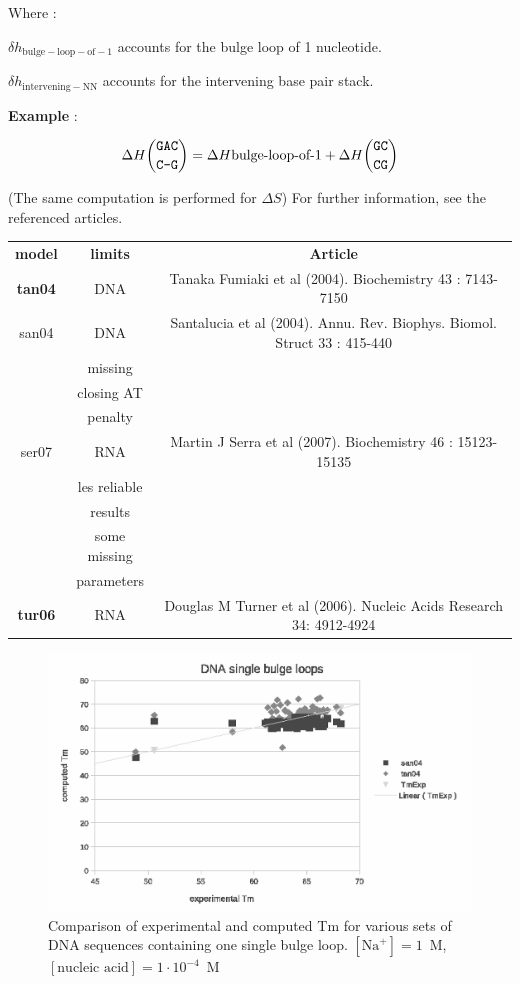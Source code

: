 \documentclass{article}
\begin{document}
Where :

$\delta{}h_\mathrm{bulge-loop-of-1}$ accounts for the bulge loop of 1 nucleotide.

$\delta{}h_\mathrm{intervening-NN}$ accounts for the intervening base pair stack.


\textbf{Example} :

\begin{multline*}
\Delta H {\mbox{\texttt{GAC}} \choose \mbox{\texttt{C-G}}} =
\Delta H {\mbox{bulge-loop-of-1}} +
\Delta H {\mbox{\texttt{GC}} \choose \mbox{\texttt{CG}}} \\
\end{multline*}

       (The same computation is performed for $\Delta S$) 
For further information, see the referenced articles.

\begin{table}[h]
\begin{tabular}[h]{| c | c | c |}
\textbf{model} & \textbf{limits} & \textbf{Article} \\
\textbf{tan04} & DNA & Tanaka Fumiaki et al (2004). Biochemistry 43 : 7143-7150 \\
san04 & DNA & Santalucia et al (2004). Annu. Rev. Biophys. Biomol. Struct 33 : 415-440\\
 & missing & \\
 & closing AT & \\
 & penalty & \\
ser07 & RNA & Martin J Serra et al (2007). Biochemistry 46 : 15123-15135 \\
 & les reliable & \\
 & results & \\
 & some missing & \\
 & parameters & \\
\textbf{tur06} & RNA & Douglas M Turner et al (2006). Nucleic Acids Research 34: 4912-4924 \\
\end{tabular}
\end{table}

\begin{figure}[h]
\includegraphics{images/DNASingleBulgeLoop.eps}
\caption{Comparison of experimental and computed Tm for various sets of
 DNA sequences containing one single bulge loop. $[\mbox{Na}^+] = 1$~M, $[\mbox{nucleic acid}] = 1\cdot{}10^{-4}$~M}
\end{figure}
\end{document}
